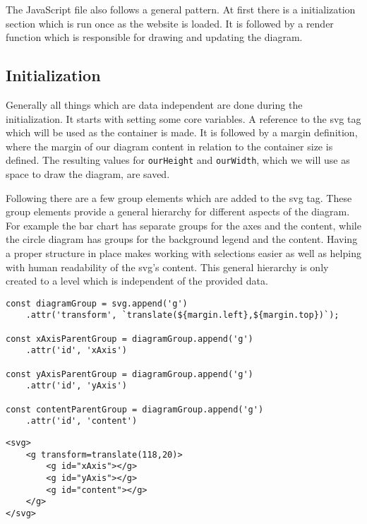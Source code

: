 The JavaScript file also follows a general pattern. At first there is a initialization section which is run once as the website is loaded. It is followed by a render function which is responsible for drawing and updating the diagram. 

\subsection{Initialization}
Generally all things which are data independent are done during the initialization. It starts with setting some core variables. A reference to the svg tag which will be used as the container is made. It is followed by a margin definition, where the margin of our diagram content in relation to the container size is defined. The resulting values for \verb|ourHeight| and \verb|ourWidth|, which we will use as space to draw the diagram, are saved. 

Following there are a few group elements which are added to the svg tag. These group elements provide a general hierarchy for different aspects of the diagram. For example the bar chart has separate groups for the axes and the content, while the circle diagram has groups for the background legend and the content. Having a proper structure in place makes working with selections easier as well as helping with human readability of the svg's content. This general hierarchy is only created to a level which is independent of the provided data.

\begin{minipage}{\linewidth}
\begin{lstlisting}[style=htmlcssjs, caption={JavaScript code to create the hierarchy as used in the bar-chart}, label={hierarchy_creation}]
const diagramGroup = svg.append('g')
    .attr('transform', `translate(${margin.left},${margin.top})`);

const xAxisParentGroup = diagramGroup.append('g')
    .attr('id', 'xAxis')

const yAxisParentGroup = diagramGroup.append('g')
    .attr('id', 'yAxis')

const contentParentGroup = diagramGroup.append('g')
    .attr('id', 'content')
\end{lstlisting}
\begin{lstlisting}[style=htmlcssjs, caption={Resulting HTML structure}, label={hierarchy_result}]
<svg>
    <g transform=translate(118,20)>
        <g id="xAxis"></g>
        <g id="yAxis"></g>
        <g id="content"></g>
    </g>
</svg>
    \end{lstlisting}
\end{minipage}


